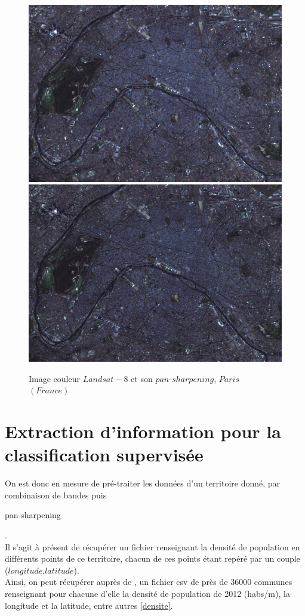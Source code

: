 \documentclass{book}
\begin{document}
\begin{figure}[H]
\begin{center}
\includegraphics[scale=0.4]{images/paris_rgb_zoom.png}
\includegraphics[scale=0.2]{images/paris_rgb_zoom_pansharpened.png}
\end{center}
\caption{Image couleur $Landsat-8$ et son $pan$-$sharpening$, $Paris$ $(France)$}
\label{pan_sharpen}
\end{figure}

\clearpage

\section{Extraction d'information pour la classification supervisée}

On est donc en mesure de pré-traiter les données d'un territoire donné, par combinaison de bandes puis \begin{itshape}pan-sharpening\end{itshape}.\\
Il s'agit à présent de récupérer un fichier renseignant la densité de population en différents points de ce territoire, chacun 
de ces points étant repéré par un couple ($longitude$,$latitude$).\\
Ainsi, on peut récupérer auprès de \cite{sql-data}, un fichier csv de près de 36000 communes renseignant pour chacune d'elle la densité de population de 2012 (habs/m), la 
longitude et la latitude, entre autres \ref{densite}.
\end{document}
